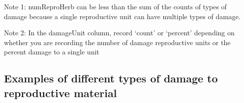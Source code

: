 \documentclass[
  letterpaper,
  DIV=11,
  numbers=noendperiod]{scrreprt}
\begin{document}
Note 1: numReproHerb can be less than the sum of the counts of types of
damage because a single reproductive unit can have multiple types of
damage.

Note 2: In the damageUnit column, record `count' or `percent' depending
on whether you are recording the number of damage reproductive units or
the percent damage to a single unit

\subsection{Examples of different types of damage to reproductive
material}\label{examples-of-different-types-of-damage-to-reproductive-material}

\begin{figure}

\begin{minipage}{0.50\linewidth}



\end{minipage}%
%
\begin{minipage}{0.50\linewidth}

\centering{

}
\end{minipage}
\end{figure}
\end{document}
